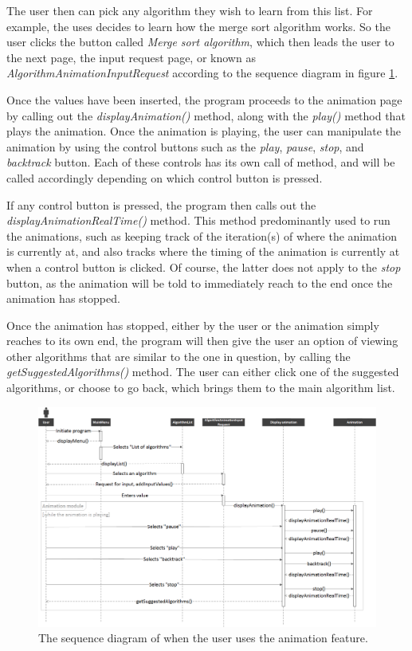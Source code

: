 The user then can pick any algorithm they wish to learn from this list. For example, the uses decides to learn how the merge sort algorithm works. So the user clicks the button called \textit{Merge sort algorithm}, which then leads the user to the next page, the input request page, or known as \textit{AlgorithmAnimationInputRequest} according to the sequence diagram in figure \ref{sequenceDiagramShowAlgorithmList}.

Once the values have been inserted, the program proceeds to the animation page by calling out the \textit{displayAnimation()} method, along with the \textit{play()} method that plays the animation. Once the animation is playing, the user can manipulate the animation by using the control buttons such as the \textit{play}, \textit{pause}, \textit{stop}, and \textit{backtrack} button. Each of these controls has its own call of method, and will be called accordingly depending on which control button is pressed. 

If any control button is pressed, the program then calls out the \textit{displayAnimationRealTime()} method. This method predominantly used to run the animations, such as keeping track of the iteration(s) of where the animation is currently at, and also tracks where the timing of the animation is currently at when a control button is clicked. Of course, the latter does not apply to the \textit{stop} button, as the animation will be told to immediately reach to the end once the animation has stopped. 

Once the animation has stopped, either by the user or the animation simply reaches to its own end, the program will then give the user an option of viewing other algorithms that are similar to the one in question, by calling the \textit{getSuggestedAlgorithms()} method. The user can either click one of the suggested algorithms, or choose to go back, which brings them to the main algorithm list.

\begin{landscape}
\begin{figure}[H]
\centering
\includegraphics[scale=0.55]{images/report_images/sequenceDiagramShowAlgorithmList.png}
\caption{The sequence diagram of when the user uses the animation feature.}
\label{sequenceDiagramShowAlgorithmList}
\end{figure}
\end{landscape}

